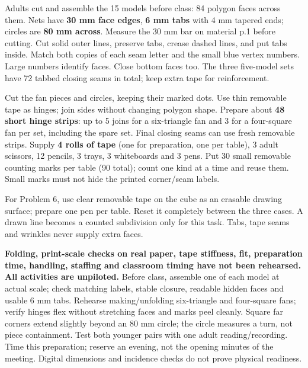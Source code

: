 \documentclass[11pt,letterpaper]{article}
\newcommand{\sub}[1]{\par\vspace{3pt}{\bfseries #1}\par}
\begin{document}
\sub{Cut, crease, close, label}
Adults cut and assemble the 15 models before class: 84 polygon faces across them. Nets have \textbf{30 mm face edges}, \textbf{6 mm tabs} with 4 mm tapered ends; circles are \textbf{80 mm across}. Measure the 30 mm bar on material p.1 before cutting. Cut solid outer lines, preserve tabs, crease dashed lines, and put tabs inside. Match both copies of each seam letter and the small blue vertex numbers. Large numbers identify faces. Close bottom faces too. The three five-model sets have 72 tabbed closing seams in total; keep extra tape for reinforcement.

Cut the fan pieces and circles, keeping their marked dots. Use thin removable tape as hinges; join sides without changing polygon shape. Prepare about \textbf{48 short hinge strips}: up to 5 joins for a six-triangle fan and 3 for a four-square fan per set, including the spare set. Final closing seams can use fresh removable strips. Supply \textbf{4 rolls of tape} (one for preparation, one per table), 3 adult scissors, 12 pencils, 3 trays, 3 whiteboards and 3 pens. Put 30 small removable counting marks per table (90 total); count one kind at a time and reuse them. Small marks must not hide the printed corner/seam labels.

For Problem 6, use clear removable tape on the cube as an erasable drawing surface; prepare one pen per table. Reset it completely between the three cases. A drawn line becomes a counted subdivision only for this task. Tabs, tape seams and wrinkles never supply extra faces.

\sub{Physical checks still to perform}
\textbf{Folding, print-scale checks on real paper, tape stiffness, fit, preparation time, handling, staffing and classroom timing have not been rehearsed. All activities are unpiloted.} Before class, assemble one of each model at actual scale; check matching labels, stable closure, readable hidden faces and usable 6 mm tabs. Rehearse making/unfolding six-triangle and four-square fans; verify hinges flex without stretching faces and marks peel cleanly. Square far corners extend slightly beyond an 80 mm circle; the circle measures a turn, not piece containment. Test both younger pairs with one adult reading/recording. Time this preparation; reserve an evening, not the opening minutes of the meeting. Digital dimensions and incidence checks do not prove physical readiness.
\end{document}
